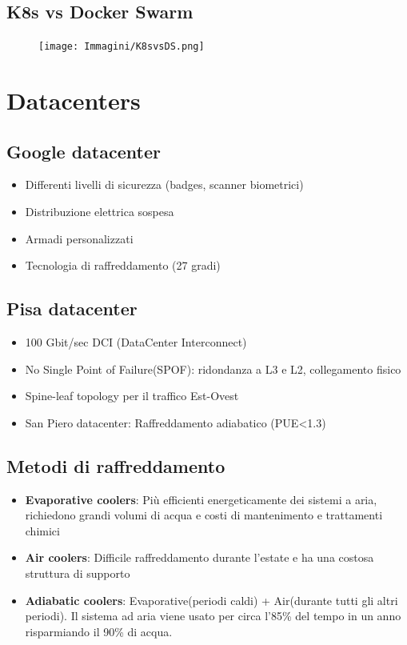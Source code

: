 \documentclass[a4paper, 12pt]{report}
\begin{document}
          \section{K8s vs Docker Swarm}
          \begin{figure}[htbp]
            \centering
            \texttt{[image: Immagini/K8svsDS.png]}
          \end{figure}
          \chapter{Datacenters}
          \section{Google datacenter}
          \begin{itemize}
            \item Differenti livelli di sicurezza (badges, scanner biometrici)
            \item Distribuzione elettrica sospesa
            \item Armadi personalizzati
            \item Tecnologia di raffreddamento (27 gradi)
          \end{itemize}
          \section{Pisa datacenter}
          \begin{itemize}
            \item 100 Gbit/sec DCI (DataCenter Interconnect)
            \item No Single Point of Failure(SPOF): ridondanza a L3 e L2, collegamento fisico
            \item Spine-leaf topology per il traffico Est-Ovest
            \item San Piero datacenter: Raffreddamento adiabatico (PUE<1.3)
          \end{itemize}
          \section{Metodi di raffreddamento}
          \begin{itemize}
            \item \textbf{Evaporative coolers}: Più efficienti energeticamente dei sistemi a aria, richiedono grandi volumi di acqua e costi di mantenimento e trattamenti chimici
            \item \textbf{Air coolers}: Difficile raffreddamento durante l'estate e ha una costosa struttura di supporto
            \item \textbf{Adiabatic coolers}: Evaporative(periodi caldi) + Air(durante tutti gli altri periodi). Il sistema ad aria viene usato per circa l'85\% del tempo in un anno risparmiando il 90\% di acqua.
          \end{itemize}
\end{document}
